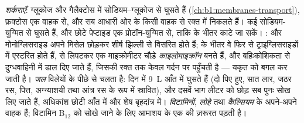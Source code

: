 \begin{proposition}[अवशोषण के रास्ते]\label{prop:b1:digestion-absorption:routes}
\emph{शर्कराएँ}: ग्लूकोज और गैलैक्टोस  में
सोडियम--ग्लूकोज  से घुसते हैं (\cref{ch:b1:membranes-transport}),
फ्रक्टोस एक वाहक से, और सब आधारी ओर के किसी वाहक से रक्त में निकलते हैं।
\emph{} कई सोडियम-युग्मित  से घुसते हैं, और छोटे
पेप्टाइड एक प्रोटॉन-युग्मित  से, ताकि  के भीतर काटे जा सकें।
\emph{}:  और मोनोग्लिसराइड अपने मिसेल छोड़कर शीर्ष झिल्ली से
विसरित होते हैं;  के भीतर वे फिर से ट्राइग्लिसराइडों में एस्टरित
होते हैं,  से लिपटकर एक माइक्रोमीटर चौड़े \emph{काइलोमाइक्रॉन}
बनते हैं, और बहिःकोशिकता से दुग्धवाहिनी में डाल दिए जाते हैं, जिसकी 
रक्त तक केवल गर्दन पर पहुँचती है ---  यकृत को बगल कर जाती है।
\emph{जल} विलेयों के पीछे  से चलता है: दिन में \qty{9}{L} आँत में
घुसते हैं (दो पिए हुए, सात लार, जठर रस, पित्त, अग्न्याशयी तथा आंत्र रस के
रूप में स्रावित), और दसवें भाग लीटर को छोड़ सब पुनः सोख लिए जाते हैं,
अधिकांश छोटी आँत में और शेष बृहदांत्र में। \emph{विटामिनों},
\emph{लोहे} तथा \emph{कैल्सियम} के अपने-अपने वाहक हैं; विटामिन B$_{12}$
को सोखे जाने के लिए आमाशय के एक  की ज़रूरत पड़ती है।
\end{proposition}

